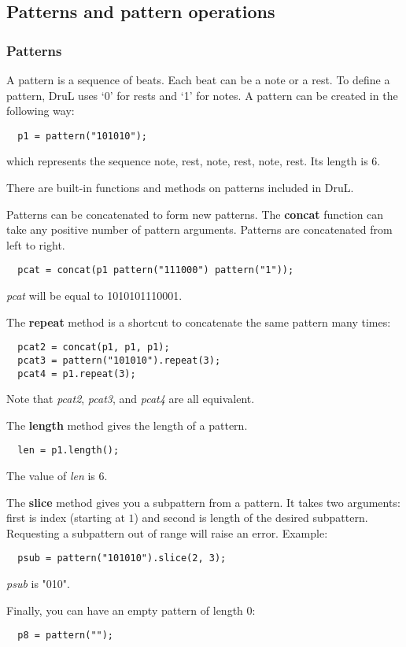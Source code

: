 \subsection{Patterns and pattern operations}

\subsubsection{Patterns}

A pattern is a sequence of beats.  Each beat can be a note or a rest.
To define a pattern, DruL uses `0' for rests and `1' for notes.
A pattern can be created in the following way:
\begin{verbatim}
  p1 = pattern("101010");
\end{verbatim}
which represents the sequence {note, rest, note, rest, note, rest}.
Its length is $6$.

There are built-in functions and methods on patterns included in DruL.

Patterns can be concatenated to form new patterns.  The \textbf{concat} function can take any positive number of pattern arguments.  Patterns are concatenated from left to right.
\begin{verbatim}
  pcat = concat(p1 pattern("111000") pattern("1"));
\end{verbatim}
\textit{pcat} will be equal to 1010101110001.

The \textbf{repeat} method is a shortcut to concatenate the same pattern many times:
\begin{verbatim}
  pcat2 = concat(p1, p1, p1);
  pcat3 = pattern("101010").repeat(3);
  pcat4 = p1.repeat(3);
\end{verbatim}
Note that \textit{pcat2}, \textit{pcat3}, and \textit{pcat4} are all equivalent.

The \textbf{length} method gives the length of a pattern.
\begin{verbatim}
  len = p1.length();
\end{verbatim}
The value of \textit{len} is $6$.

The \textbf{slice} method gives you a subpattern from a pattern.
It takes two arguments: first is index (starting at $1$) and second is
length of the desired subpattern. Requesting a subpattern out of range will
raise an error. Example:
\begin{verbatim}
  psub = pattern("101010").slice(2, 3);
\end{verbatim}
\textit{psub} is "010".


Finally, you can have an empty pattern of length $0$:
\begin{verbatim}
  p8 = pattern("");
\end{verbatim}



